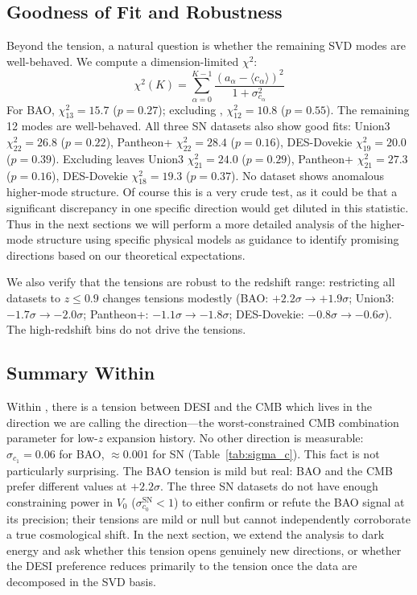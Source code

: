\subsection{Goodness of Fit and Robustness}
\label{sec:robustness}

Beyond the \czero tension, a natural question is whether the remaining SVD modes are well-behaved. We compute a dimension-limited $\chi^2$:
\begin{equation}
\chi^2(K) = \sum_{\alpha=0}^{K-1} \frac{(a_\alpha - \langle c_\alpha \rangle)^2}{1 + \sigma_{c_\alpha}^2}
\label{eq:chi2_K}
\end{equation}
For BAO, $\chi^2_{13} = 15.7$ ($p = 0.27$); excluding \czero, $\chi^2_{12} = 10.8$ ($p = 0.55$). The remaining 12 modes are well-behaved. All three SN datasets also show good fits: Union3 $\chi^2_{22} = 26.8$ ($p = 0.22$), Pantheon+ $\chi^2_{22} = 28.4$ ($p = 0.16$), DES-Dovekie $\chi^2_{19} = 20.0$ ($p = 0.39$). Excluding \czero leaves Union3 $\chi^2_{21} = 24.0$ ($p = 0.29$), Pantheon+ $\chi^2_{21} = 27.3$ ($p = 0.16$), DES-Dovekie $\chi^2_{18} = 19.3$ ($p = 0.37$). No dataset shows anomalous higher-mode structure. Of course this is a very crude test, as it could be that a significant discrepancy in one specific direction would get diluted in this statistic. Thus in the next sections we will perform a more detailed analysis of the higher-mode structure using specific physical models as guidance to identify promising directions based on our theoretical expectations. 

We also verify that the tensions are robust to the redshift range: restricting all datasets to $z \leq 0.9$ changes tensions modestly (BAO: $+2.2\sigma \to +1.9\sigma$; Union3: $-1.7\sigma \to -2.0\sigma$; Pantheon+: $-1.1\sigma \to -1.8\sigma$; DES-Dovekie: $-0.8\sigma \to -0.6\sigma$). The high-redshift bins do not drive the tensions.

\subsection{Summary Within \LCDM}
\label{sec:central_finding_lcdm}

Within \LCDM, there is a tension between DESI and the CMB which lives in the direction we are calling the \omh direction---the worst-constrained CMB combination parameter for low-$z$ expansion history. No other direction is measurable: $\sigma_{c_1} = 0.06$ for BAO, $\approx 0.001$ for SN (Table~\ref{tab:sigma_c}). This fact is not particularly surprising. The BAO \czero tension is mild but real: BAO and the CMB prefer different \omh values at $+2.2\sigma$. The three SN datasets do not have enough constraining power in $V_0$ ($\sigma_{c_0}^\mathrm{SN} < 1$) to either confirm or refute the BAO signal at its precision; their tensions are mild or null but cannot independently corroborate a true cosmological shift.
In the next section, we extend the analysis to \wowa dark energy and ask whether this tension opens genuinely new directions, or whether the DESI \wowa preference reduces primarily to the \czero tension once the data are decomposed in the \LCDM SVD basis.

